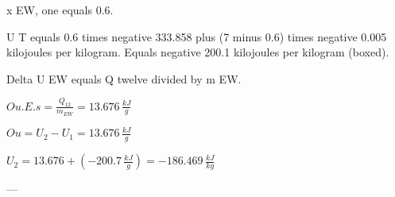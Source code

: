 x EW, one equals 0.6.  

U T equals 0.6 times negative 333.858 plus (7 minus 0.6) times negative 0.005 kilojoules per kilogram.  
Equals negative 200.1 kilojoules per kilogram (boxed).  

Delta U EW equals Q twelve divided by m EW.

\( Ou.E.s = \frac{Q_{12}}{m_{EW}} = 13.676 \, \frac{kJ}{g} \)  

\( Ou = U_2 - U_1 = 13.676 \, \frac{kJ}{g} \)  

\( U_2 = 13.676 + (-200.7 \, \frac{kJ}{g}) = -186.469 \, \frac{kJ}{kg} \)  

---